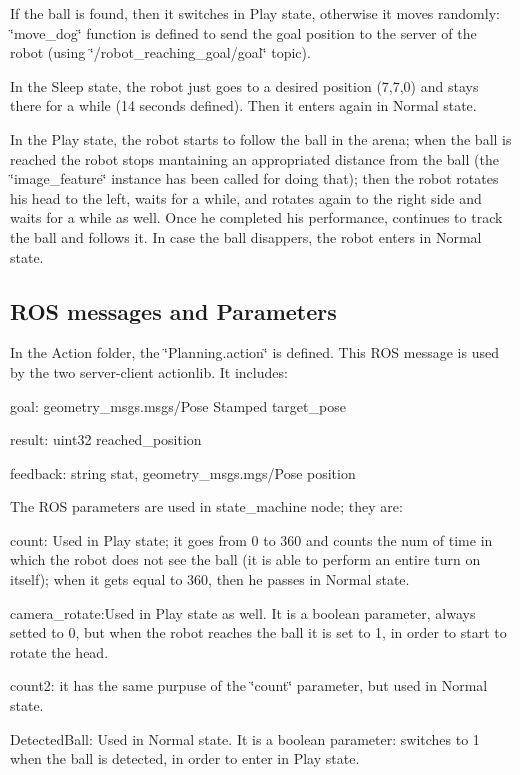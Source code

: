  

If the ball is found, then it switches in Play state, otherwise it moves randomly\+: \char`\"{}move\+\_\+dog\char`\"{} function is defined to send the goal position to the server of the robot (using \char`\"{}/robot\+\_\+reaching\+\_\+goal/goal\char`\"{} topic).

In the Sleep state, the robot just goes to a desired position (7,7,0) and stays there for a while (14 seconds defined). Then it enters again in Normal state.

In the Play state, the robot starts to follow the ball in the arena; when the ball is reached the robot stops mantaining an appropriated distance from the ball (the \char`\"{}image\+\_\+feature\char`\"{} instance has been called for doing that); then the robot rotates his head to the left, waits for a while, and rotates again to the right side and waits for a while as well. Once he completed his performance, continues to track the ball and follows it. In case the ball disappers, the robot enters in Normal state.

\subsection*{R\+OS messages and Parameters}

In the Action folder, the \char`\"{}\+Planning.\+action\char`\"{} is defined. This R\+OS message is used by the two server-\/client actionlib. It includes\+:


\begin{DoxyItemize}
\item goal\+: geometry\+\_\+msgs.\+msgs/\+Pose Stamped target\+\_\+pose
\item result\+: uint32 reached\+\_\+position
\item feedback\+: string stat, geometry\+\_\+msgs.\+mgs/\+Pose position
\end{DoxyItemize}

The R\+OS parameters are used in state\+\_\+machine node; they are\+:


\begin{DoxyItemize}
\item count\+: Used in Play state; it goes from 0 to 360 and counts the num of time in which the robot does not see the ball (it is able to perform an entire turn on itself); when it gets equal to 360, then he passes in Normal state.
\item camera\+\_\+rotate\+:Used in Play state as well. It is a boolean parameter, always setted to 0, but when the robot reaches the ball it is set to 1, in order to start to rotate the head.
\item count2\+: it has the same purpuse of the \char`\"{}count\char`\"{} parameter, but used in Normal state.
\item Detected\+Ball\+: Used in Normal state. It is a boolean parameter\+: switches to 1 when the ball is detected, in order to enter in Play state.
\end{DoxyItemize}

